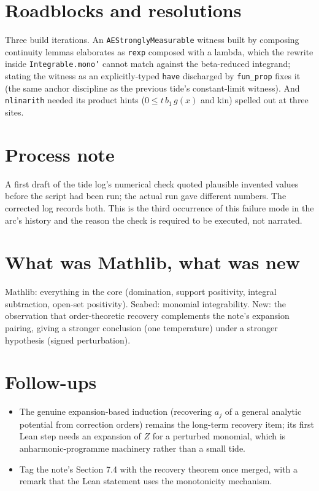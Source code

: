 \documentclass[11pt]{article}
\begin{document}
\section{Roadblocks and resolutions}

Three build iterations. An \texttt{AEStronglyMeasurable} witness built by
composing continuity lemmas elaborates as \texttt{rexp} composed with a
lambda, which the rewrite inside \texttt{Integrable.mono'} cannot match
against the beta-reduced integrand; stating the witness as an
explicitly-typed \texttt{have} discharged by \texttt{fun\_prop} fixes it
(the same anchor discipline as the previous tide's constant-limit
witness). And \texttt{nlinarith} needed its product hints
($0 \leq t\,b_1\,g(x)$ and kin) spelled out at three sites.

\section{Process note}

A first draft of the tide log's numerical check quoted plausible
invented values before the script had been run; the actual run gave
different numbers. The corrected log records both. This is the third
occurrence of this failure mode in the arc's history and the reason the
check is required to be executed, not narrated.

\section{What was Mathlib, what was new}

Mathlib: everything in the core (domination, support positivity, integral
subtraction, open-set positivity). Seabed: monomial integrability. New:
the observation that order-theoretic recovery complements the note's
expansion pairing, giving a stronger conclusion (one temperature) under a
stronger hypothesis (signed perturbation).

\section{Follow-ups}

\begin{itemize}
\item The genuine expansion-based induction (recovering $a_j$ of a
general analytic potential from correction orders) remains the long-term
recovery item; its first Lean step needs an expansion of $Z$ for a
perturbed monomial, which is anharmonic-programme machinery rather than
a small tide.
\item Tag the note's Section 7.4 with the recovery theorem once merged,
with a remark that the Lean statement uses the monotonicity mechanism.
\end{itemize}
\end{document}
